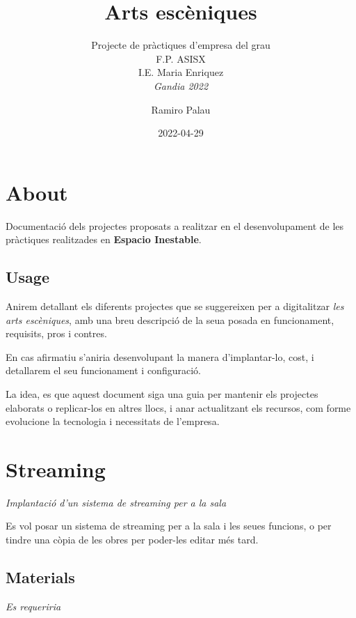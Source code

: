 \documentclass[
  10pt,
]{krantz}
\title{Arts escèniques}
\subtitle{Projecte de pràctiques d'empresa del grau\\
F.P. ASISX\\
I.E. Maria Enriquez\\
\emph{Gandia 2022}}
\author{Ramiro Palau}
\date{2022-04-29}
\begin{document}
\maketitle

{
\hypersetup{linkcolor=}
\setcounter{tocdepth}{2}
\tableofcontents
}
\hypertarget{about}{%
\chapter*{About}\label{about}}


Documentació dels projectes proposats a realitzar en el desenvolupament de les pràctiques realitzades en \textbf{Espacio Inestable}.

\hypertarget{usage}{%
\section*{Usage}\label{usage}}


Anirem detallant els diferents projectes que se suggereixen per a digitalitzar \emph{les arts escèniques}, amb una breu descripció de la seua posada en funcionament, requisits, pros i contres.

En cas afirmatiu s'aniria desenvolupant la manera d'implantar-lo, cost, i detallarem el seu funcionament i configuració.

La idea, es que aquest document siga una guia per mantenir els projectes elaborats o replicar-los en altres llocs, i anar actualitzant els recursos, com forme evolucione la tecnologia i necessitats de l'empresa.

\hypertarget{streaming}{%
\chapter{Streaming}\label{streaming}}

\emph{Implantació d'un sistema de streaming per a la sala}

Es vol posar un sistema de streaming per a la sala i les seues funcions, o per tindre una còpia de les obres per poder-les editar més tard.

\hypertarget{materials}{%
\section{Materials}\label{materials}}

\emph{Es requeriria}
\end{document}
